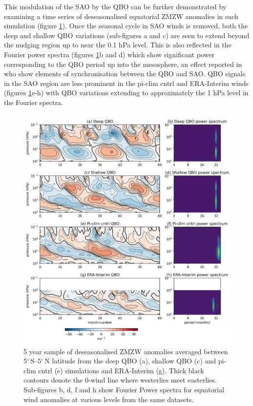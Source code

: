 This modulation of the SAO by the QBO can be further demonstrated by examining a time series of deseasonalised equatorial ZMZW anomalies in each simulation (figure \ref{fig:experiment_QBOs_anomalies}). Once the seasonal cycle in SAO winds is removed, both the deep and shallow QBO variations (sub-figures a and c) are seen to extend beyond the nudging region up to near the 0.1 hPa level. This is also reflected in the Fourier power spectra (figures \ref{fig:experiment_QBOs_anomalies}b and d) which show significant power corresponding to the QBO period up into the mesosphere, an effect reported in \cite{kuaiNonstationary2009c} who show elements of synchronisation between the QBO and SAO. QBO signals in the SAO region are less prominent in the pi-clim cntrl and ERA-Interim winds (figures \ref{fig:experiment_QBOs_anomalies}e-h) with QBO variations extending to approximately the 1 hPa level in the Fourier spectra. 

\begin{figure}[h!]
\begin{center}
\noindent\includegraphics[width = 0.75\linewidth]{Figures/Figures-deepQBO/experiment_QBOs_anomalies.png}
\caption[Equatorial ZMZW anomaly time-height profiles from QBO experiments]{5 year sample of deseasonalised ZMZW anomalies averaged between 5$^{\circ}$\,S--5$^{\circ}$\,N latitude from the deep QBO (a), shallow QBO (c) and pi-clim cntrl (e) simulations and ERA-Interim (g). Thick black contours denote the 0-wind line where westerlies meet easterlies. Sub-figures b, d, f and h show Fourier Power spectra for equatorial wind anomalies at various levels from the same datasets.}
\label{fig:experiment_QBOs_anomalies}
\end{center}
\end{figure}

